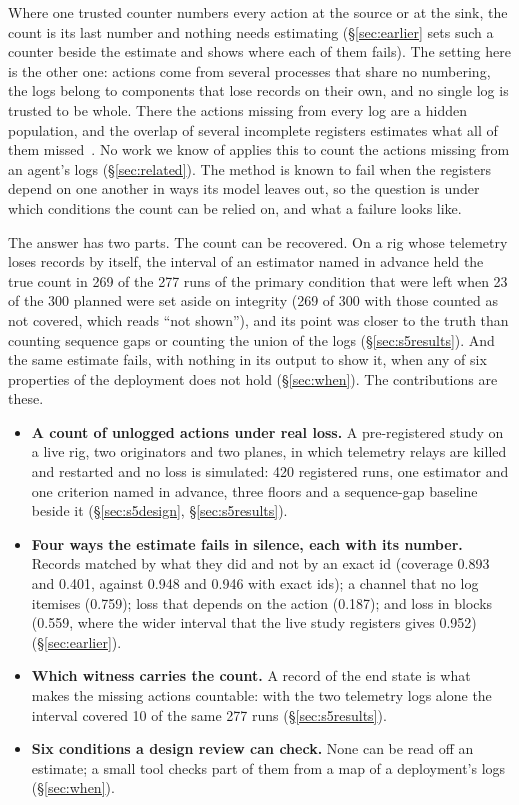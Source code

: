 \documentclass[11pt]{article}
\begin{document}
Where one trusted counter numbers every action at the source or at the sink, the count
is its last number and nothing needs estimating (\S\ref{sec:earlier} sets such a counter
beside the estimate and shows where each of them fails). The setting here is the other
one: actions come from several processes that share no numbering, the logs belong to
components that lose records on their own, and no single log is trusted to be whole.
There the actions missing from every log are a hidden population, and the overlap of
several incomplete registers estimates what all of them
missed~\citep{fienberg1972,bird2018mse}. No work we know of applies this to count the
actions missing from an agent's logs (\S\ref{sec:related}). The method is known to fail
when the registers depend on one another in ways its model leaves out, so the question
is under which conditions the count can be relied on, and what a failure looks like.

The answer has two parts. The count can be recovered. On a rig whose telemetry loses
records by itself, the interval of an estimator named in advance held the true count in
269 of the 277 runs of the primary condition that were left when 23 of the 300 planned
were set aside on integrity (269 of 300 with those counted as not covered, which reads
``not shown''), and its point was closer to the truth than counting sequence gaps or
counting the union of the logs (\S\ref{sec:s5results}). And the same estimate fails,
with nothing in its output to show it, when any of six properties of the deployment
does not hold (\S\ref{sec:when}). The contributions are these.

\begin{itemize}\setlength\itemsep{1pt}\setlength\parskip{0pt}
\item \textbf{A count of unlogged actions under real loss.} A pre-registered study on a
live rig, two originators and two planes, in which telemetry relays are killed and
restarted and no loss is simulated: 420 registered runs, one estimator and one criterion
named in advance, three floors and a sequence-gap baseline beside it
(\S\ref{sec:s5design}, \S\ref{sec:s5results}).
\item \textbf{Four ways the estimate fails in silence, each with its number.} Records
matched by what they did and not by an exact id (coverage 0.893 and 0.401, against 0.948
and 0.946 with exact ids); a channel that no log itemises (0.759); loss that depends on
the action (0.187); and loss in blocks (0.559, where the wider interval that the live
study registers gives 0.952) (\S\ref{sec:earlier}).
\item \textbf{Which witness carries the count.} A record of the end state is what makes
the missing actions countable: with the two telemetry logs alone the interval covered 10
of the same 277 runs (\S\ref{sec:s5results}).
\item \textbf{Six conditions a design review can check.} None can be read off an
estimate; a small tool checks part of them from a map of a deployment's logs
(\S\ref{sec:when}).
\end{itemize}
\end{document}
